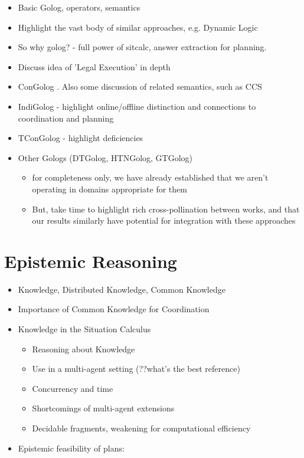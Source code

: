 \begin{itemize}
\item Basic Golog, operators, semantics \cite{levesque97golog} 
\item Highlight the vast body of similar approaches, e.g. Dynamic Logic 
\item So why golog? - full power of sitcalc, answer extraction for planning. 
\item Discuss idea of 'Legal Execution' in depth 
\item ConGolog \cite{giacomo00congolog}. Also some discussion of related
semantics, such as CCS 
\item IndiGolog - highlight online/offline distinction and connections to
coordination and planning \cite{giacomo99indigolog} 
\item TConGolog - highlight deficiencies \cite{pinto99tcongolog} 
\item Other Gologs (DTGolog, HTNGolog, GTGolog) 

\begin{itemize}
\item for completeness only, we have already established that we aren't
operating in domains appropriate for them 
\item But, take time to highlight rich cross-pollination between works,
and that our results similarly have potential for integration with
these approaches 
\end{itemize}
\end{itemize}

\section{Epistemic Reasoning}

\begin{itemize}
\item Knowledge, Distributed Knowledge, Common Knowledge \cite{halpern90knowledge_distrib,fagin95} 
\item Importance of Common Knowledge for Coordination 
\item Knowledge in the Situation Calculus 

\begin{itemize}
\item Reasoning about Knowledge \cite{moore80know_act,scherl03sc_knowledge} 
\item Use in a multi-agent setting (??what's the best reference) 
\item Concurrency and time \cite{scherl03conc_knowledge} 
\item Shortcomings of multi-agent extensions 
\item Decidable fragments, weakening for computational efficiency 
\end{itemize}
\item Epistemic feasibility of plans: \cite{giacomo04sem_delib_indigolog,Lesperance01epi_feas_casl} 
\end{itemize}

